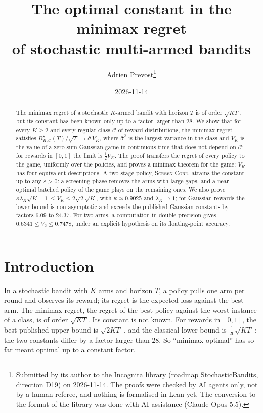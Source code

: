 \documentclass[11pt]{article}
\title{The optimal constant in the minimax regret\\ of stochastic multi-armed bandits}
\author{Adrien Prevost\thanks{Submitted by its author to the Incognita library (roadmap StochasticBandits, direction
  D19) on 2026-11-14. The proofs were checked by AI agents only, not by a human referee, and nothing is formalised in
  Lean yet. The conversion to the format of the library was done with AI assistance (Claude Opus 5.5).}}
\date{2026-11-14}
\newcommand{\1}{\mathbf{1}}
\begin{document}
\sloppy
\maketitle

\begin{abstract}
The minimax regret of a stochastic $K$-armed bandit with horizon $T$ is of order $\sqrt{KT}$, but its constant has been known only up to a factor
larger than $28$. We show that for every $K\ge2$ and every regular class $\mathcal C$ of reward distributions, the minimax regret satisfies
$R^\star_{K,\mathcal C}(T)/\sqrt T\to\bar\sigma\,V_K$, where $\bar\sigma^2$ is the largest variance in the class and $V_K$ is the value of a
zero-sum Gaussian game in continuous time that does not depend on $\mathcal C$; for rewards in $[0,1]$ the limit is $\frac12V_K$. The proof
transfers the regret of every policy to the game, uniformly over the policies, and proves a minimax theorem for the game; $V_K$ has four
equivalent descriptions. A two-stage policy, \textsc{Screen-Core}, attains the constant up to any $\varepsilon>0$: a screening phase removes the
arms with large gaps, and a near-optimal batched policy of the game plays on the remaining ones. We also prove
$\kappa\lambda_K\sqrt{K-1}\le V_K\le2\sqrt2\sqrt K$, with $\kappa\approx0.9025$ and $\lambda_K\to1$; for Gaussian rewards the lower bound is
non-asymptotic and exceeds the published Gaussian constants by factors $6.09$ to $24.37$. For two arms, a computation in double precision gives
$0.6341\le V_2\le0.7478$, under an explicit hypothesis on its floating-point accuracy.
\end{abstract}

\section{Introduction}\label{sec:intro}

In a stochastic bandit with $K$ arms and horizon $T$, a policy pulls one arm per round and observes its reward; its regret is the expected loss
against the best arm. The minimax regret, the regret of the best policy against the worst instance of a class, is of order $\sqrt{KT}$. Its
constant is not known. For rewards in $[0,1]$, the best published upper bound is $\sqrt{2KT}$ \citep[Theorem~6.1]{LS19}, and the classical
lower bound is $\frac1{20}\sqrt{KT}$ \citep[re-derived in][Appendix~B.1]{GMS19}: the two constants differ by a factor larger than $28$. So
``minimax optimal'' has so far meant optimal up to a constant factor.
\end{document}

